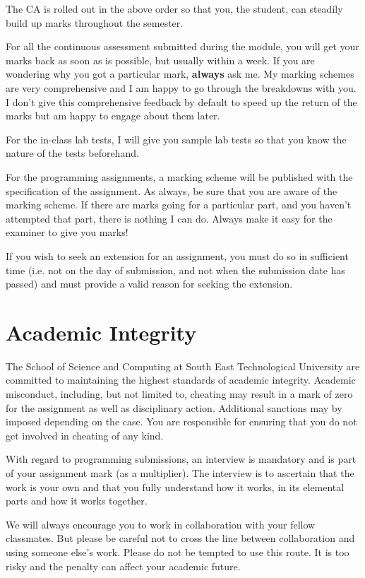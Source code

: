 \documentclass{article}
\begin{document}
The CA is rolled out in the above order so that you, the student, can steadily build up marks throughout the semester. 

For all the continuous assessment submitted during the module, you will get your marks back as soon as is possible, but usually within a week. 
If you are wondering why you got a particular mark, \textbf{always} ask me. My marking schemes are very comprehensive and I am happy to go through the breakdowns with you. 
I don't give this comprehensive feedback by default to speed up the return of the marks but am happy to engage about them later. 

For the in-class lab tests, I will give you sample lab tests so that you know the nature of the tests beforehand. 

For the programming assignments, a marking scheme will be published with the specification of the assignment. As always, be sure that you are aware of the marking scheme. 
If there are marks going for a particular part, and you haven't attempted that part, there is nothing I can do. Always make it easy for the examiner to give you marks!

If you wish to seek an extension for an assignment, you must do so in sufficient time (i.e. not on the day of submission, and not 
when the submission date has passed) and must provide a valid reason for seeking the extension. 


\section{Academic Integrity}
The School of Science and Computing  at South East Technological University are  committed to maintaining the highest standards of academic integrity. 
Academic misconduct, including, but not limited to, cheating may result in a mark of zero for the assignment as well as disciplinary action.
Additional sanctions may by imposed depending on the case. You are responsible for ensuring that you do not get involved in cheating of any kind. 
 
With regard to programming submissions, an interview is mandatory and is part of your assignment mark (as a multiplier). 
The interview is to ascertain that the work is your own and that you fully understand how it works, in its elemental parts and how it works together. 
 
We  will always encourage you to work in collaboration with your fellow classmates. But please be careful not to cross the line between collaboration and using someone else's work. 
Please do not be tempted to use this route. 
It is too risky and the penalty can affect your academic future. 
\end{document}
